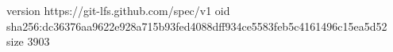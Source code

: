 version https://git-lfs.github.com/spec/v1
oid sha256:dc36376aa9622e928a715b93fed4088dff934ce5583feb5c4161496c15ea5d52
size 3903
